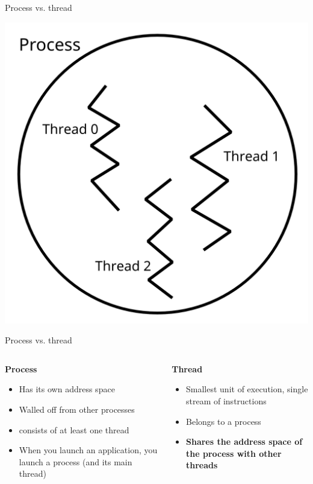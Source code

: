 \documentclass{beamer}
\begin{document}
\begin{frame}{Process vs. thread}
\begin{center}
\includegraphics[width=.65\linewidth]{proc_thread.png}
\end{center}
\end{frame}

\begin{frame}{Process vs. thread}
\begin{columns}
\begin{column}{0.5\textwidth}
\textbf{Process} \\
\begin{itemize}
\item Has its own address space
\item Walled off from other processes
\item consists of at least one thread
\item When you launch an application, you launch a process (and its main thread)
\end{itemize}
\end{column}
\begin{column}{0.5\textwidth}
\textbf{Thread} \\
\begin{itemize}
\item Smallest unit of execution, single stream of instructions
\item Belongs to a process
\item \textbf{Shares the address space of the process with other threads}
\end{itemize}
\end{column}
\end{columns}
\end{frame}
\end{document}

